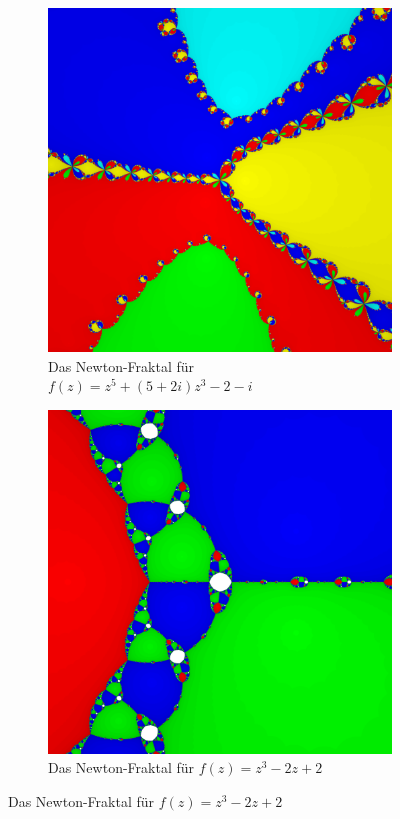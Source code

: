 \documentclass[a4paper,12pt]{llncs}
\makeatletter
\newcommand\nocaption{%
	\renewcommand\p@subfigure{}
	\renewcommand\thesubfigure{\thefigure\alph{subfigure}}
}
\numberwithin{equation}{section}
\makeatother
\begin{document}
\begin{figure}[ht]   
	\nocaption
	\begin{subfigure}{.5\textwidth}
		\centering
		\includegraphics[width=.7\linewidth]{figures/output_f7}
		\captionsetup{width=0.8\textwidth}
		\caption{Das Newton-Fraktal für $f(z)=z^5 + (5+2i)z^3 - 2-i $ }
		\label{fig:output_f7}
	\end{subfigure}%
	\begin{subfigure}{.5\textwidth}
		\centering
		\includegraphics[width=.7\linewidth]{figures/output_f5}
		\captionsetup{width=0.8\textwidth}
		\caption{Das Newton-Fraktal für $f(z)=z^3 - 2z + 2$ }
		\label{fig:output_f5}

	\end{subfigure}%
\end{figure}
\end{document}
